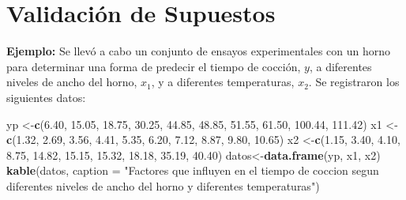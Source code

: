 \documentclass[
]{book}
\newenvironment{Shaded}{\begin{snugshade}}{\end{snugshade}}
\newcommand{\AttributeTok}[1]{\textcolor[rgb]{0.13,0.29,0.53}{#1}}
\newcommand{\FloatTok}[1]{\textcolor[rgb]{0.00,0.00,0.81}{#1}}
\newcommand{\FunctionTok}[1]{\textcolor[rgb]{0.13,0.29,0.53}{\textbf{#1}}}
\newcommand{\NormalTok}[1]{#1}
\newcommand{\OtherTok}[1]{\textcolor[rgb]{0.56,0.35,0.01}{#1}}
\newcommand{\StringTok}[1]{\textcolor[rgb]{0.31,0.60,0.02}{#1}}
\begin{document}
\section{Validación de Supuestos}\label{validaciuxf3n-de-supuestos}

\textbf{Ejemplo:} Se llevó a cabo un conjunto de ensayos experimentales con un horno para determinar una forma de predecir el tiempo de cocción, \(y\), a diferentes niveles de ancho del horno, \(x_1\), y a diferentes temperaturas, \(x_2\). Se registraron los siguientes datos:

\begin{Shaded}
\begin{Highlighting}[]
\NormalTok{yp }\OtherTok{\textless{}{-}}\FunctionTok{c}\NormalTok{(}\FloatTok{6.40}\NormalTok{, }\FloatTok{15.05}\NormalTok{, }\FloatTok{18.75}\NormalTok{, }\FloatTok{30.25}\NormalTok{, }\FloatTok{44.85}\NormalTok{, }\FloatTok{48.85}\NormalTok{, }\FloatTok{51.55}\NormalTok{, }\FloatTok{61.50}\NormalTok{, }\FloatTok{100.44}\NormalTok{, }\FloatTok{111.42}\NormalTok{)}
\NormalTok{x1 }\OtherTok{\textless{}{-}}\FunctionTok{c}\NormalTok{(}\FloatTok{1.32}\NormalTok{, }\FloatTok{2.69}\NormalTok{, }\FloatTok{3.56}\NormalTok{, }\FloatTok{4.41}\NormalTok{, }\FloatTok{5.35}\NormalTok{, }\FloatTok{6.20}\NormalTok{, }\FloatTok{7.12}\NormalTok{, }\FloatTok{8.87}\NormalTok{, }\FloatTok{9.80}\NormalTok{, }\FloatTok{10.65}\NormalTok{)}
\NormalTok{x2 }\OtherTok{\textless{}{-}}\FunctionTok{c}\NormalTok{(}\FloatTok{1.15}\NormalTok{, }\FloatTok{3.40}\NormalTok{, }\FloatTok{4.10}\NormalTok{, }\FloatTok{8.75}\NormalTok{, }\FloatTok{14.82}\NormalTok{, }\FloatTok{15.15}\NormalTok{, }\FloatTok{15.32}\NormalTok{, }\FloatTok{18.18}\NormalTok{, }\FloatTok{35.19}\NormalTok{, }\FloatTok{40.40}\NormalTok{)}
\NormalTok{datos}\OtherTok{\textless{}{-}}\FunctionTok{data.frame}\NormalTok{(yp, x1, x2)}
\FunctionTok{kable}\NormalTok{(datos, }\AttributeTok{caption =} \StringTok{"Factores que influyen en el tiempo de coccion segun diferentes niveles de ancho del horno y diferentes temperaturas"}\NormalTok{)}
\end{Highlighting}
\end{Shaded}
\end{document}
